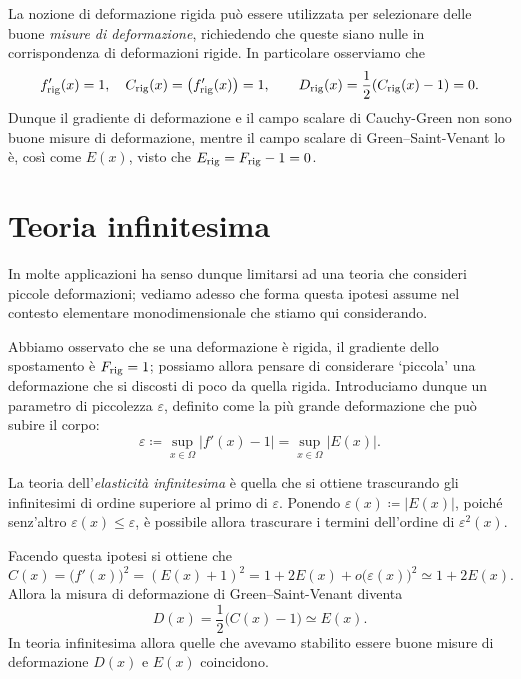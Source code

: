 La nozione di deformazione rigida può essere utilizzata per selezionare delle buone \textit{misure di deformazione}, richiedendo che queste siano nulle in corrispondenza di deformazioni rigide. In particolare osserviamo che
\begin{equation}
 f_{\rm rig}'(x)=1, \quad C_{\rm rig}(x)=\big( f_{\rm rig}'(x)\big)=1, \qquad D_{\rm rig}(x)=\frac{1}{2}( C_{\rm rig}(x)-1)=0.
\end{equation}
Dunque il gradiente di deformazione e il campo scalare di Cauchy-Green non sono buone misure di deformazione, mentre il campo scalare di Green--Saint-Venant lo è, così come $E(x)$, visto che $E_{\rm rig}=F_{\rm rig}-1=0$.

\section{Teoria infinitesima}
In molte  applicazioni ha senso dunque limitarsi ad una teoria che consideri piccole deformazioni; vediamo adesso che forma questa ipotesi assume nel contesto elementare monodimensionale che stiamo qui considerando.

Abbiamo osservato che se una deformazione è rigida, il gradiente dello spostamento è $F_{\rm rig}=1$; possiamo allora pensare di considerare `piccola' una deformazione che si discosti di poco da quella rigida. Introduciamo dunque un parametro di piccolezza $\varepsilon$, definito come la più grande deformazione che può subire il corpo:
\begin{equation}
\varepsilon\coloneqq \sup_{x\in\Omega}|f'(x)-1|=\sup_{x\in\Omega}|E(x)|.
\end{equation}

La teoria dell’\textit{elasticità infinitesima} è quella  che si ottiene trascurando gli infinitesimi di ordine superiore al primo di $\varepsilon$. Ponendo $\varepsilon(x)\coloneqq |E(x)|$, poiché senz'altro $\varepsilon(x)\leq \varepsilon$, è possibile allora trascurare i termini dell'ordine di $\varepsilon^2(x)$.

Facendo questa ipotesi si ottiene che
\begin{equation}
C(x)=\big(f'(x)\big)^2=(E(x)+1)^2=1+2 E(x)+o\big(\varepsilon(x)\big)^2\simeq 1+2 E(x).
\end{equation}
Allora la misura di deformazione di Green--Saint-Venant diventa
\begin{equation}
D(x)=\frac12 \big( C(x)-1 \big)\simeq E(x).
\end{equation}
In teoria infinitesima allora quelle che avevamo stabilito essere buone misure di deformazione $D(x)$
 e $E(x)$ coincidono.






